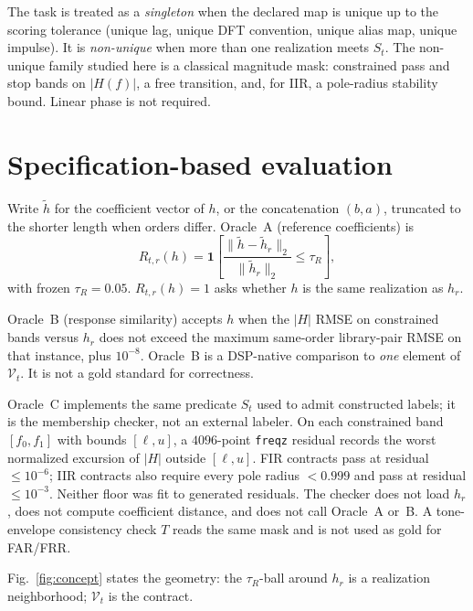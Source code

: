 \documentclass{article}
\begin{document}
The task is treated as a \emph{singleton} when the declared map is
unique up to the scoring tolerance (unique lag, unique DFT convention,
unique alias map, unique impulse).
It is \emph{non-unique} when more than one realization meets $S_t$.
The non-unique family studied here is a classical magnitude mask:
constrained pass and stop bands on $\lvert H(f)\rvert$, a free
transition, and, for IIR, a pole-radius stability bound.
Linear phase is not required.

\section{Specification-based evaluation}
\label{sec:method}

Write $\tilde h$ for the coefficient vector of $h$, or the
concatenation $(b,a)$, truncated to the shorter length when orders
differ.
Oracle~A (reference coefficients) is
\begin{equation}
R_{t,r}(h)
=\mathbf{1}\!\left[
\frac{\lVert \tilde h-\tilde h_r\rVert_2}{\lVert\tilde h_r\rVert_2}
\le\tau_R\right],
\label{eq:r}
\end{equation}
with frozen $\tau_R=0.05$.
$R_{t,r}(h)=1$ asks whether $h$ is the same realization as $h_r$.

Oracle~B (response similarity) accepts $h$ when the
$\lvert H\rvert$ RMSE on constrained bands versus $h_r$ does not
exceed the maximum same-order library-pair RMSE on that instance,
plus $10^{-8}$.
Oracle~B is a DSP-native comparison to \emph{one} element of
$\mathcal{V}_t$.
It is not a gold standard for correctness.

Oracle~C implements the same predicate $S_t$ used to admit
constructed labels; it is the membership checker, not an external
labeler.
On each constrained band $[f_0,f_1]$ with bounds $[\ell,u]$, a
$4096$-point \texttt{freqz} residual records the worst normalized
excursion of $\lvert H\rvert$ outside $[\ell,u]$.
FIR contracts pass at residual $\le 10^{-6}$; IIR contracts also
require every pole radius $<0.999$ and pass at residual
$\le 10^{-3}$.
Neither floor was fit to generated residuals.
The checker does not load $h_r$, does not compute coefficient
distance, and does not call Oracle~A or~B.
A tone-envelope consistency check $T$ reads the same mask and is not
used as gold for FAR/FRR.

Fig.~\ref{fig:concept} states the geometry: the $\tau_R$-ball around
$h_r$ is a realization neighborhood; $\mathcal{V}_t$ is the contract.
\end{document}
